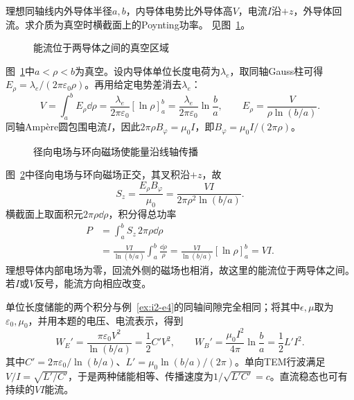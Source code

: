 \begin{exercise}[同轴线中的电磁能流]\label{ex:i4-h10}
理想同轴线内外导体半径$a,b$，内导体电势比外导体高$V$，电流$I$沿$+z$，外导体回流。求介质为真空时横截面上的Poynting功率。 见图~\ref{fig:i4-h10-q}。
\end{exercise}

\begin{figure}[H]\centering
{}
\caption{能流位于两导体之间的真空区域}\label{fig:i4-h10-q}
\end{figure}
\begin{solution}
图~\ref{fig:i4-h10-q}中$a<\rho<b$为真空。设内导体单位长度电荷为$\lambda_e$，取同轴Gauss柱可得$E_\rho=\lambda_e/(2\pi\varepsilon_0\rho)$。再用给定电势差消去$\lambda_e$：
\[
V=\int_a^bE_\rho\dd\rho
=\frac{\lambda_e}{2\pi\varepsilon_0}[\ln\rho]_a^b
=\frac{\lambda_e}{2\pi\varepsilon_0}\ln\frac ba,\qquad
E_\rho=\frac{V}{\rho\ln(b/a)}.
\]
同轴Ampère圆包围电流$I$，因此$2\pi\rho B_\varphi=\mu_0I$，即$B_\varphi=\mu_0I/(2\pi\rho)$。
\begin{figure}[H]\centering
{}
\caption{径向电场与环向磁场使能量沿线轴传播}\label{fig:i4-h10-s}
\end{figure}
图~\ref{fig:i4-h10-s}中径向电场与环向磁场正交，其叉积沿$+z$，故
\[
S_z=\frac{E_\rho B_\varphi}{\mu_0}
=\frac{VI}{2\pi\rho^2\ln(b/a)}.
\]
横截面上取面积元$2\pi\rho\dd\rho$，积分得总功率
\[
\begin{aligned}
P&=\int_a^bS_z\,2\pi\rho\dd\rho\\
&=\frac{VI}{\ln(b/a)}\int_a^b\frac{\dd\rho}{\rho}
=\frac{VI}{\ln(b/a)}[\ln\rho]_a^b
=\boxed{VI}.
\end{aligned}
\]
理想导体内部电场为零，回流外侧的磁场也相消，故这里的能流位于两导体之间。若$I$或$V$反号，能流方向相应改变。

单位长度储能的两个积分与例~\ref{ex:i2-e4}的同轴间隙完全相同；将其中$\epsilon,\mu$取为$\varepsilon_0,\mu_0$，并用本题的电压、电流表示，得到
\[
W_E'=\frac{\pi\varepsilon_0V^2}{\ln(b/a)}=\frac12C'V^2,\qquad
W_B'=\frac{\mu_0I^2}{4\pi}\ln\frac ba=\frac12L'I^2.
\]
其中$C'=2\pi\varepsilon_0/\ln(b/a)$、$L'=\mu_0\ln(b/a)/(2\pi)$。单向TEM行波满足$V/I=\sqrt{L'/C'}$，于是两种储能相等、传播速度为$1/\sqrt{L'C'}=c$。直流稳态也可有持续的$VI$能流。
\end{solution}

